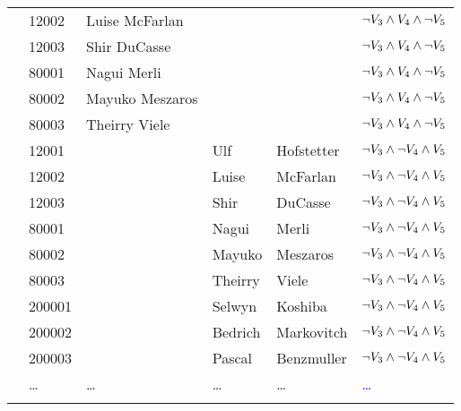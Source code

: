 \begin{table}
\begin{tabular} {c !{\color{black}\vrule} l l l l : l }
& 12002 & Luise McFarlan & & & \textcolor{blue}{$\neg \vThree \wedge \vFour \wedge \neg \vFive$}\\
& 12003 & Shir DuCasse & & & \textcolor{blue}{$\neg \vThree \wedge \vFour \wedge \neg \vFive$}\\
 &80001 & Nagui Merli & & & \textcolor{blue}{$\neg \vThree \wedge \vFour \wedge \neg \vFive$}\\
 & 80002 & Mayuko Meszaros & & & \textcolor{blue}{$\neg \vThree \wedge \vFour \wedge \neg \vFive$}\\
 & 80003 & Theirry Viele & & & \textcolor{blue}{$\neg \vThree \wedge \vFour \wedge \neg \vFive$}\\
 & 12001 & & Ulf & Hofstetter & \textcolor{blue}{$\neg \vThree \wedge \neg \vFour \wedge \vFive$}\\
& 12002 & & Luise & McFarlan& \textcolor{blue}{$\neg \vThree \wedge \neg \vFour \wedge \vFive$}\\
& 12003 & & Shir & DuCasse& \textcolor{blue}{$\neg \vThree \wedge \neg \vFour \wedge \vFive$}\\
 &80001 & & Nagui & Merli& \textcolor{blue}{$\neg \vThree \wedge \neg \vFour \wedge \vFive$}\\
 & 80002 & & Mayuko & Meszaros& \textcolor{blue}{$\neg \vThree \wedge \neg \vFour \wedge \vFive$}\\
 & 80003 & & Theirry & Viele& \textcolor{blue}{$\neg \vThree \wedge \neg \vFour \wedge \vFive$}\\
 & 200001 & & Selwyn & Koshiba & \textcolor{blue}{$\neg \vThree \wedge \neg \vFour \wedge \vFive$}\\
 & 200002 & & Bedrich & Markovitch & \textcolor{blue}{$\neg \vThree \wedge \neg \vFour \wedge \vFive$}\\
 & 200003 & & Pascal & Benzmuller & \textcolor{blue}{$\neg \vThree \wedge \neg \vFour \wedge \vFive$} \\
 & \ldots  & \ldots & \ldots & \ldots& \textcolor{blue}{\ldots} \\
\hline
\end{tabular}

\end{table}
